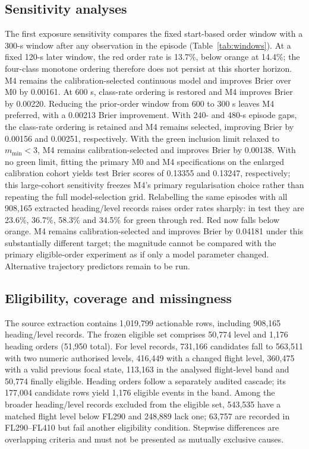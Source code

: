 \documentclass[pdflatex,sn-mathphys-num]{sn-jnl}
\newcommand{\mmin}{m_{\min}}
\begin{document}
\subsection{Sensitivity analyses}
The first exposure sensitivity compares the fixed start-based order window with a 300-s window after any observation in the episode (Table~\ref{tab:windows}). At a fixed 120-s later window, the red order rate is 13.7\%, below orange at 14.4\%; the four-class monotone ordering therefore does not persist at this shorter horizon. M4 remains the calibration-selected continuous model and improves Brier over M0 by 0.00161. At 600 s, class-rate ordering is restored and M4 improves Brier by 0.00220. Reducing the prior-order window from 600 to 300 s leaves M4 preferred, with a 0.00213 Brier improvement. With 240- and 480-s episode gaps, the class-rate ordering is retained and M4 remains selected, improving Brier by 0.00156 and 0.00251, respectively. With the green inclusion limit relaxed to $\mmin<3$, M4 remains calibration-selected and improves Brier by 0.00138. With no green limit, fitting the primary M0 and M4 specifications on the enlarged calibration cohort yields test Brier scores of 0.13355 and 0.13247, respectively; this large-cohort sensitivity freezes M4's primary regularisation choice rather than repeating the full model-selection grid. Relabelling the same episodes with all 908,165 extracted heading/level records raises order rates sharply: in test they are 23.6\%, 36.7\%, 58.3\% and 34.5\% for green through red. Red now falls below orange. M4 remains calibration-selected and improves Brier by 0.04181 under this substantially different target; the magnitude cannot be compared with the primary eligible-order experiment as if only a model parameter changed. Alternative trajectory predictors remain to be run.

\subsection{Eligibility, coverage and missingness}
The source extraction contains 1,019,799 actionable rows, including 908,165 heading/level records. The frozen eligible set comprises 50,774 level and 1,176 heading orders (51,950 total). For level records, 731,166 candidates fall to 563,511 with two numeric authorised levels, 416,449 with a changed flight level, 360,475 with a valid previous focal state, 113,163 in the analysed flight-level band and 50,774 finally eligible. Heading orders follow a separately audited cascade; its 177,004 candidate rows yield 1,176 eligible events in the band. Among the broader heading/level records excluded from the eligible set, 543,535 have a matched flight level below FL290 and 248,889 lack one; 63,757 are recorded in FL290--FL410 but fail another eligibility condition. Stepwise differences are overlapping criteria and must not be presented as mutually exclusive causes.
\end{document}
